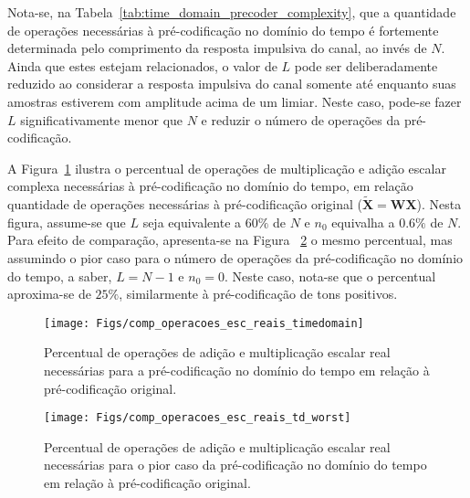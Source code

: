 Nota-se, na Tabela~\ref{tab:time_domain_precoder_complexity}, que a quantidade de operações necessárias à pré-codificação no domínio do tempo é fortemente determinada pelo comprimento da resposta impulsiva do canal, ao invés de $N$. Ainda que estes estejam relacionados, o valor de $L$ pode ser deliberadamente reduzido ao considerar a resposta impulsiva do canal somente até enquanto suas amostras estiverem com amplitude acima de um limiar. Neste caso, pode-se fazer $L$ significativamente menor que $N$ e reduzir o número de operações da pré-codificação.

A Figura~\ref{fig:comp_operacoes_esc_reais_timedomain} ilustra o percentual de operações de multiplicação e adição escalar complexa necessárias à pré-codificação no domínio do tempo, em relação quantidade de operações necessárias à pré-codificação original ($\tilde{\mathbf{X}} = \mathbf{WX}$). Nesta figura, assume-se que $L$ seja equivalente a $60\%$ de $N$ e $n_0$ equivalha a $0.6\%$ de $N$. Para efeito de comparação, apresenta-se na Figura~ \ref{fig:comp_operacoes_esc_reais_td_worst} o mesmo percentual, mas assumindo o pior caso para o número de operações da pré-codificação no domínio do tempo, a saber, $L=N-1$ e $n_0 =0$. Neste caso, nota-se que o percentual aproxima-se de $25\%$, similarmente à pré-codificação de tons positivos.

\begin{figure}[H]
\centering
\texttt{[image: Figs/comp\_operacoes\_esc\_reais\_timedomain]}
\caption{ Percentual de operações de adição e multiplicação escalar real necessárias para a pré-codificação no domínio do tempo em relação à pré-codificação original.  \label{fig:comp_operacoes_esc_reais_timedomain}}
\end{figure}

\begin{figure}[H]
\centering
\texttt{[image: Figs/comp\_operacoes\_esc\_reais\_td\_worst]}
\caption{ Percentual de operações de adição e multiplicação escalar real necessárias para o pior caso da pré-codificação no domínio do tempo em relação à pré-codificação original.  \label{fig:comp_operacoes_esc_reais_td_worst}}
\end{figure}





